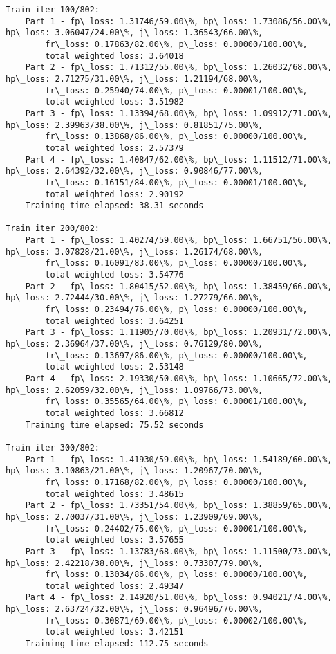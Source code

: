 \documentclass[11pt]{article}
\begin{document}
\begin{Verbatim}[commandchars=\\\{\}]
Train iter 100/802:
	Part 1 - fp\_loss: 1.31746/59.00\%, bp\_loss: 1.73086/56.00\%, hp\_loss: 3.06047/24.00\%, j\_loss: 1.36543/66.00\%, 
		fr\_loss: 0.17863/82.00\%, p\_loss: 0.00000/100.00\%, 
		total weighted loss: 3.64018
	Part 2 - fp\_loss: 1.71312/55.00\%, bp\_loss: 1.26032/68.00\%, hp\_loss: 2.71275/31.00\%, j\_loss: 1.21194/68.00\%, 
		fr\_loss: 0.25940/74.00\%, p\_loss: 0.00001/100.00\%, 
		total weighted loss: 3.51982
	Part 3 - fp\_loss: 1.13394/68.00\%, bp\_loss: 1.09912/71.00\%, hp\_loss: 2.39963/38.00\%, j\_loss: 0.81851/75.00\%, 
		fr\_loss: 0.13868/86.00\%, p\_loss: 0.00000/100.00\%, 
		total weighted loss: 2.57379
	Part 4 - fp\_loss: 1.40847/62.00\%, bp\_loss: 1.11512/71.00\%, hp\_loss: 2.64392/32.00\%, j\_loss: 0.90846/77.00\%, 
		fr\_loss: 0.16151/84.00\%, p\_loss: 0.00001/100.00\%, 
		total weighted loss: 2.90192
	Training time elapsed: 38.31 seconds

Train iter 200/802:
	Part 1 - fp\_loss: 1.40274/59.00\%, bp\_loss: 1.66751/56.00\%, hp\_loss: 3.07828/21.00\%, j\_loss: 1.26174/68.00\%, 
		fr\_loss: 0.16091/83.00\%, p\_loss: 0.00000/100.00\%, 
		total weighted loss: 3.54776
	Part 2 - fp\_loss: 1.80415/52.00\%, bp\_loss: 1.38459/66.00\%, hp\_loss: 2.72444/30.00\%, j\_loss: 1.27279/66.00\%, 
		fr\_loss: 0.23494/76.00\%, p\_loss: 0.00000/100.00\%, 
		total weighted loss: 3.64251
	Part 3 - fp\_loss: 1.11905/70.00\%, bp\_loss: 1.20931/72.00\%, hp\_loss: 2.36964/37.00\%, j\_loss: 0.76129/80.00\%, 
		fr\_loss: 0.13697/86.00\%, p\_loss: 0.00000/100.00\%, 
		total weighted loss: 2.53148
	Part 4 - fp\_loss: 2.19330/50.00\%, bp\_loss: 1.10665/72.00\%, hp\_loss: 2.62059/32.00\%, j\_loss: 1.09766/73.00\%, 
		fr\_loss: 0.35565/64.00\%, p\_loss: 0.00001/100.00\%, 
		total weighted loss: 3.66812
	Training time elapsed: 75.52 seconds

Train iter 300/802:
	Part 1 - fp\_loss: 1.41930/59.00\%, bp\_loss: 1.54189/60.00\%, hp\_loss: 3.10863/21.00\%, j\_loss: 1.20967/70.00\%, 
		fr\_loss: 0.17168/82.00\%, p\_loss: 0.00000/100.00\%, 
		total weighted loss: 3.48615
	Part 2 - fp\_loss: 1.73351/54.00\%, bp\_loss: 1.38859/65.00\%, hp\_loss: 2.70037/31.00\%, j\_loss: 1.23909/69.00\%, 
		fr\_loss: 0.24402/75.00\%, p\_loss: 0.00001/100.00\%, 
		total weighted loss: 3.57655
	Part 3 - fp\_loss: 1.13783/68.00\%, bp\_loss: 1.11500/73.00\%, hp\_loss: 2.42218/38.00\%, j\_loss: 0.73307/79.00\%, 
		fr\_loss: 0.13034/86.00\%, p\_loss: 0.00000/100.00\%, 
		total weighted loss: 2.49347
	Part 4 - fp\_loss: 2.14920/51.00\%, bp\_loss: 0.94021/74.00\%, hp\_loss: 2.63724/32.00\%, j\_loss: 0.96496/76.00\%, 
		fr\_loss: 0.30871/69.00\%, p\_loss: 0.00002/100.00\%, 
		total weighted loss: 3.42151
	Training time elapsed: 112.75 seconds


\end{Verbatim}
\end{document}

